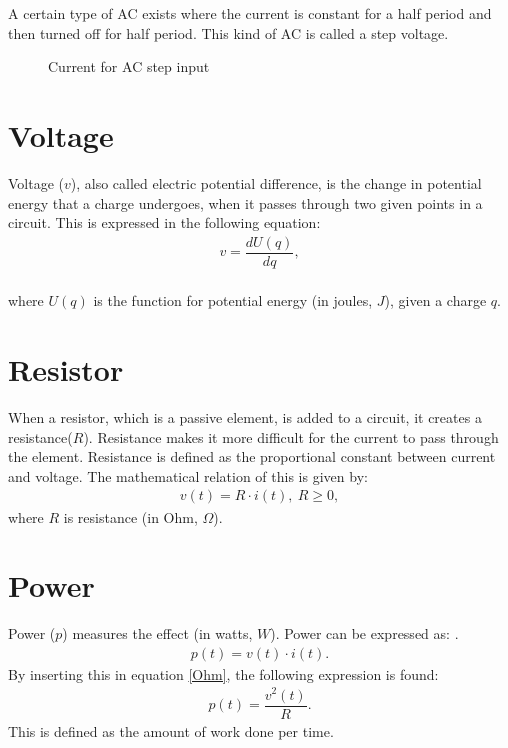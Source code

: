 \noindent A certain type of AC exists where the current is constant for a half period and then turned off for half period. This kind of AC is called a step voltage.
\begin{figure}[H] 

\caption{Current for AC step input}
\end{figure}
\section{Voltage}
Voltage ($v$), also called electric potential difference, is the change in potential energy that a charge undergoes, when it passes through two given points in a circuit. This is expressed in the following equation:
\begin{align*}
	v=\dfrac{dU(q)}{dq},
\end{align*}
\\
where $U(q)$ is the function for potential energy (in joules, $J$), given a charge $q$.
\section{Resistor}
When a resistor, which is a passive element, is added to a circuit, it creates a resistance($R$). Resistance makes it more difficult for the current to pass through the element. Resistance is defined as the proportional constant between current and voltage. The mathematical relation of this is given by: \cite[p.~22]{bcircuit5}
\begin{align} 
\label{Ohm}
v(t)=R\cdot i(t),\ R\geq0,
\end{align}
where $R$ is resistance (in Ohm, $\Omega$).
\section{Power} 
Power ($p$) measures the effect (in watts, $W$). Power can be expressed as: \cite[p. 22]{bcircuit5}.
\begin{align} 
\label{power}
p(t)=v(t)\cdot i(t).
\end{align}
By inserting this in equation \eqref{Ohm}, the following expression is found:
\begin{align}
p(t)=\dfrac{v^2(t)}{R}. \label{resistor:power}
\end{align}
This is defined as the amount of work done per time. 
